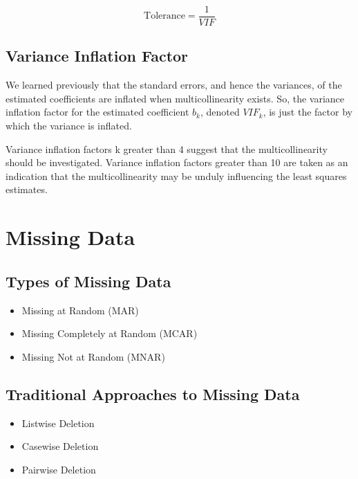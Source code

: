 \documentclass[11pt]{article} %
\begin{document}
\[ \mbox{Tolerance} = \frac{1}{VIF}\]

\subsection{Variance Inflation Factor}



We learned previously that the standard errors, and hence the variances, of 
the estimated coefficients are inflated when multicollinearity exists. 
So, the variance inflation factor for the estimated coefficient $b_k$, denoted $VIF_k$, 
is just the factor by which the variance is inflated. 

Variance inflation factors k greater than 4 suggest that the multicollinearity should be investigated. 
Variance inflation factors greater than 10 are taken as an indication that the multicollinearity may be unduly influencing the least squares estimates.


\section{Missing Data}
\subsection{Types of Missing Data}
\begin{itemize}
\item Missing at Random (MAR)
\item Missing Completely at Random (MCAR)
\item Missing Not at Random (MNAR)
\end{itemize}

\subsection{Traditional Approaches to Missing Data}
\begin{itemize}
\item Listwise Deletion
\item Casewise Deletion
\item Pairwise Deletion
\end{itemize}
\end{document}

